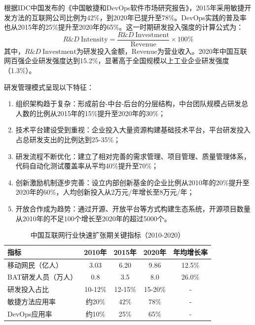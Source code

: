 根据IDC中国发布的《中国敏捷和DevOps软件市场研究报告》，2015年采用敏捷开发方法的互联网公司比例为42\%，到2020年已提升至78\%\cite{idc2023agile}。DevOps实践的普及率也从2015年的25\%提升至2020年的65\%。这一时期研发投入强度的计算公式为：
\begin{equation}
R\&D\ \mathrm{Intensity} = \frac{R\&D\ \mathrm{Investment}}{\mathrm{Revenue}} \times 100\%
\label{eq:rd-intensity}
\end{equation}
其中，$R\&D\ \mathrm{Investment}$为研发投入金额，$\mathrm{Revenue}$为营业收入。2020年中国互联网百强企业研发强度达到15.2\%，显著高于全国规模以上工业企业研发强度（1.3\%）。

研发管理模式呈现以下特征：

\begin{enumerate}
\item 组织架构趋于复杂：形成前台-中台-后台的分层结构，中台团队规模占研发总人数的比例从2015年的15\%提升至2020年的30\%；
\item 技术平台建设受到重视：企业投入大量资源构建基础技术平台，平台研发投入占总研发支出的比例达到25-35\%；
\item 研发流程不断优化：建立了相对完善的需求管理、项目管理、质量管理体系，代码自动化测试覆盖率从平均40\%提升至70\%；
\item 创新激励机制逐步完善：设立内部创新基金的企业比例从2010年的20\%提升至2020年的60\%，人均创新投入从2万元/年增长至8万元/年；
\item 开放合作成为趋势：通过开源、开放平台等方式构建生态系统，开源项目数量从2010年的不足100个增长至2020年的超过5000个。
\end{enumerate}

\begin{table}[htbp]
\centering
\caption{中国互联网行业快速扩张期关键指标（2010-2020）}
\label{tab:expansion-stage-metrics}
\begin{tabular}{lcccc}
\toprule
\textbf{指标} & \textbf{2010年} & \textbf{2015年} & \textbf{2020年} & \textbf{年均增长率} \\
\midrule
移动网民（亿人） & 3.03 & 6.20 & 9.86 & 12.5\% \\
BAT研发人员（万人） & 0.8 & 3.5 & 8.0 & 26.0\% \\
研发投入占比 & 10-12\% & 12-15\% & 15-20\% & - \\
敏捷方法应用率 & 约20\% & 42\% & 78\% & - \\
DevOps应用率 & 约10\% & 25\% & 65\% & - \\
\bottomrule
\end{tabular}
\end{table}

